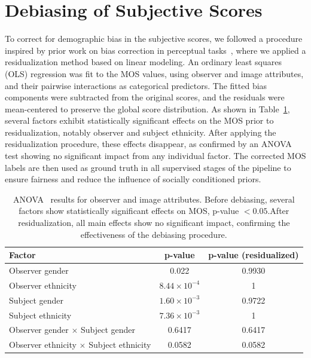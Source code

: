 \section{Debiasing of Subjective Scores}

To correct for demographic bias in the subjective scores, we followed a procedure inspired by prior work on bias correction in perceptual tasks~\cite{clapes2018apparent}, where we applied a residualization method based on linear modeling. An ordinary least squares (OLS) regression was fit to the MOS values, using observer and image attributes, and their pairwise interactions as categorical predictors. The fitted bias components were subtracted from the original scores, and the residuals were mean-centered to preserve the global score distribution. As shown in Table~\ref{tab:anova}, several factors exhibit statistically significant effects on the MOS prior to residualization, notably observer and subject ethnicity. After applying the residualization procedure, these effects disappear, as confirmed by an ANOVA test showing no significant impact from any individual factor. The corrected MOS labels are then used as ground truth in all supervised stages of the pipeline to ensure fairness and reduce the influence of socially conditioned priors.

\begin{table}
    \centering
    \caption{ANOVA~\cite{ross2017one} results for observer and image attributes. Before debiasing, several factors show statistically significant effects on MOS, p-value $< 0.05$.\@ After residualization, all main effects show no significant impact, confirming the effectiveness of the debiasing procedure.}\label{tab:anova}
    \begin{tabular}{lcc}
        \hline %
        Factor & p-value & p-value (residualized) \\
        \hline %
        Observer gender                             & 0.022                 & 0.9930 \\
        Observer ethnicity                          & $8.44 \times 10^{-4}$ & 1 \\
        Subject gender                              & $1.60 \times 10^{-3}$ & 0.9722 \\
        Subject ethnicity                           & $7.36 \times 10^{-3}$ & 1 \\
        Observer gender $\times$ Subject gender     & 0.6417              & 0.6417 \\
        Observer ethnicity $\times$ Subject ethnicity & 0.0582              & 0.0582 \\
        \hline %
    \end{tabular}
\end{table}

